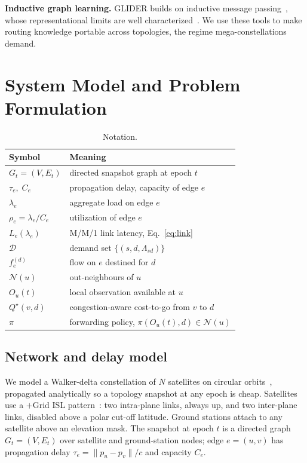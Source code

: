 \documentclass[conference]{IEEEtran}
\begin{document}
\textbf{Inductive graph learning.} GLIDER builds on inductive message passing~\cite{hamilton2017graphsage,gilmer2017mpnn}, whose representational limits are well characterized~\cite{xu2019gin,velickovic2018gat,kipf2017gcn}. We use these tools to make routing knowledge portable across topologies, the regime mega-constellations demand.

\section{System Model and Problem Formulation}\label{sec:problem}

\begin{table}[t]
\centering
\caption{Notation.}
\label{tab:notation}
\small
\begin{tabular}{ll}
\toprule
Symbol & Meaning \\
\midrule
$G_t=(V,E_t)$ & directed snapshot graph at epoch $t$ \\
$\tau_e,\;C_e$ & propagation delay, capacity of edge $e$ \\
$\lambda_e$ & aggregate load on edge $e$ \\
$\rho_e=\lambda_e/C_e$ & utilization of edge $e$ \\
$L_e(\lambda_e)$ & M/M/1 link latency, Eq.~\eqref{eq:link} \\
$\mathcal{D}$ & demand set $\{(s,d,\Lambda_{sd})\}$ \\
$f^{(d)}_e$ & flow on $e$ destined for $d$ \\
$\mathcal{N}(u)$ & out-neighbours of $u$ \\
$O_u(t)$ & local observation available at $u$ \\
$Q^\star(v,d)$ & congestion-aware cost-to-go from $v$ to $d$ \\
$\pi$ & forwarding policy, $\pi(O_u(t),d)\in\mathcal{N}(u)$ \\
\bottomrule
\end{tabular}
\end{table}

\subsection{Network and delay model}
We model a Walker-delta constellation of $N$ satellites on circular orbits~\cite{walker1984constellations}, propagated analytically so a topology snapshot at any epoch is cheap. Satellites use a $+$Grid ISL pattern~\cite{kassing2020hypatia}: two intra-plane links, always up, and two inter-plane links, disabled above a polar cut-off latitude. Ground stations attach to any satellite above an elevation mask. The snapshot at epoch $t$ is a directed graph $G_t=(V,E_t)$ over satellite and ground-station nodes; edge $e=(u,v)$ has propagation delay $\tau_e=\lVert p_u-p_v\rVert/c$ and capacity $C_e$.
\end{document}

